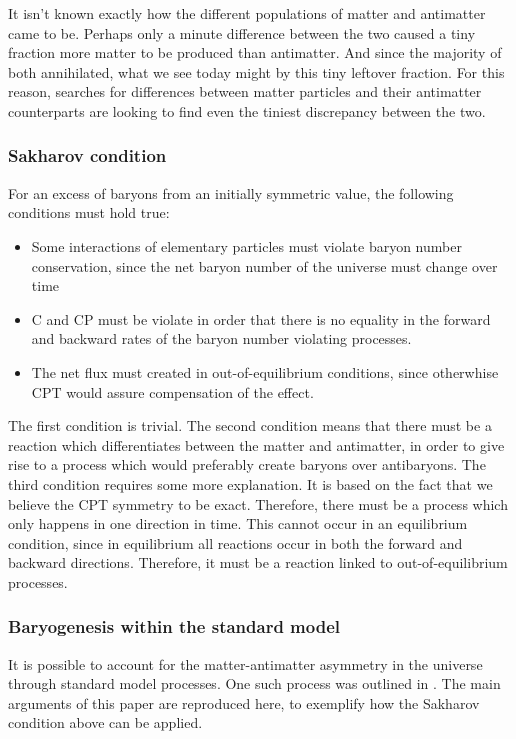 It isn't known exactly how the different populations of matter and antimatter came to be. Perhaps only a minute difference between the two caused a tiny fraction more matter to be produced than antimatter. And since the majority of both annihilated, what we see today might by this tiny leftover fraction. For this reason, searches for differences between matter particles and their antimatter counterparts are looking to find even the tiniest discrepancy between the two\cite{}. 

\subsubsection{Sakharov condition}\label{sec:IntroSakharovContidion}
For an excess of baryons from an initially symmetric value, the following conditions must hold true:
\begin{itemize}
    \item Some interactions of elementary particles must violate baryon number conservation, since the net baryon number of the universe must change over time
    \item C and CP must be violate in order that there is no equality in the forward and backward rates of the baryon number violating processes. 
    \item The net flux must created in out-of-equilibrium conditions, since otherwhise CPT would assure compensation of the effect. 
\end{itemize}

The first condition is trivial. The second condition means that there must be a reaction which differentiates between the matter and antimatter, in order to give rise to a process which would preferably create baryons over antibaryons. The third condition requires some more explanation. It is based on the fact that we believe the CPT symmetry to be exact. Therefore, there must be a process which only happens in one direction in time. This cannot occur in an equilibrium condition, since in equilibrium all reactions occur in both the forward and backward directions. Therefore, it must be a reaction linked to out-of-equilibrium processes. 


\subsubsection{Baryogenesis within the standard model}\label{sec:IntroBaryogenesisSM}
It is possible to account for the matter-antimatter asymmetry in the universe through standard model processes. One such process was outlined in \cite{Bubbles_asymmetry}. The main arguments of this paper are reproduced here, to exemplify how the Sakharov condition above can be applied. \\

